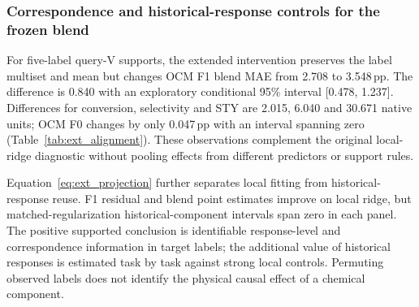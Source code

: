\documentclass[11pt,a4paper]{article}
\newcommand{\pp}{\,pp}
\begin{document}
\subsubsection{Correspondence and historical-response controls for the frozen blend}
For five-label query-V supports, the extended intervention preserves the label multiset and mean but changes OCM F1 blend MAE from 2.708 to 3.548\pp{}.
The difference is 0.840 with an exploratory conditional 95\% interval [0.478, 1.237].
Differences for conversion, selectivity and STY are 2.015, 6.040 and 30.671 native units; OCM F0 changes by only 0.047\pp{} with an interval spanning zero (Table~\ref{tab:ext_alignment}).
These observations complement the original local-ridge diagnostic without pooling effects from different predictors or support rules.
\begin{table}[htbp]\centering\footnotesize
\setlength{\tabcolsep}{4pt}
\caption{Extended permutation diagnostic for five-label query-V supports. Each arm retains the same support set. Intervals are exploratory conditional 95\% grouped-bootstrap intervals, not a redefined family-adjusted primary comparison.}\label{tab:ext_alignment}

\end{table}

Equation~\ref{eq:ext_projection} further separates local fitting from historical-response reuse.
F1 residual and blend point estimates improve on local ridge, but matched-regularization historical-component intervals span zero in each panel.
The positive supported conclusion is identifiable response-level and correspondence information in target labels; the additional value of historical responses is estimated task by task against strong local controls.
Permuting observed labels does not identify the physical causal effect of a chemical component.
\end{document}
